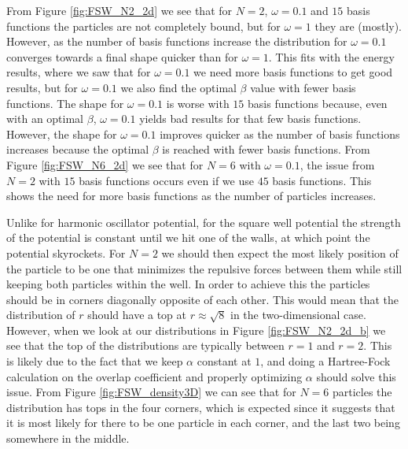 \documentclass[../main.tex]{subfiles}
\begin{document}
From Figure \ref{fig:FSW_N2_2d} we see that for $N=2$, $\omega = 0.1$ and $15$ basis functions the particles are not completely bound, but for $\omega = 1$ they are (mostly). However, as the number of basis functions increase the distribution for $\omega = 0.1$ converges towards a final shape quicker than for $\omega = 1$. This fits with the energy results, where we saw that for $\omega = 0.1$ we need more basis functions to get good results, but for $\omega = 0.1$ we also find the optimal $\beta$ value with fewer basis functions. The shape for $\omega = 0.1$ is worse with $15$ basis functions because, even with an optimal $\beta$, $\omega = 0.1$ yields bad results for that few basis functions. However, the shape for $\omega = 0.1$ improves quicker as the number of basis functions increases because the optimal $\beta$ is reached with fewer basis functions. From Figure \ref{fig:FSW_N6_2d} we see that for $N=6$ with $\omega = 0.1$, the issue from $N=2$ with $15$ basis functions occurs even if we use $45$ basis functions. This shows the need for more basis functions as the number of particles increases.

Unlike for harmonic oscillator potential, for the square well potential the strength of the potential is constant until we hit one of the walls, at which point the potential skyrockets. For $N=2$ we should then expect the most likely position of the particle to be one that minimizes the repulsive forces between them while still keeping both particles within the well. In order to achieve this the particles should be in corners diagonally opposite of each other. This would mean that the distribution of $r$ should have a top at $r \approx \sqrt{8}$ in the two-dimensional case. However, when we look at our distributions in Figure \ref{fig:FSW_N2_2d_b} we see that the top of the distributions are typically between $r=1$ and $r=2$. This is likely due to the fact that we keep $\alpha$ constant at $1$, and doing a Hartree-Fock calculation on the overlap coefficient and properly optimizing $\alpha$ should solve this issue. From Figure \ref{fig:FSW_density3D} we can see that for $N=6$ particles the distribution has tops in the four corners, which is expected since it suggests that it is most likely for there to be one particle in each corner, and the last two being somewhere in the middle.
\end{document}
